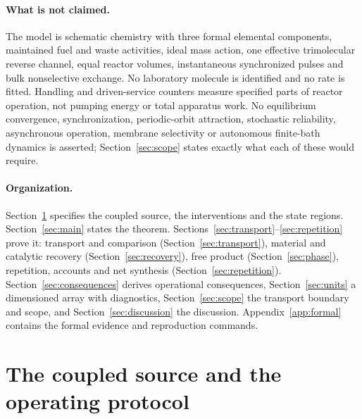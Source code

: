 \documentclass[11pt,a4paper]{article}
\theoremstyle{plain}
\theoremstyle{definition}
\theoremstyle{remark}
\begin{document}
\paragraph{What is not claimed.}
The model is schematic chemistry with three formal elemental components, maintained fuel and waste activities, ideal mass action, one effective trimolecular reverse channel, equal reactor volumes, instantaneous synchronized pulses and bulk nonselective exchange. No laboratory molecule is identified and no rate is fitted. Handling and driven-service counters measure specified parts of reactor operation, not pumping energy or total apparatus work. No equilibrium convergence, synchronization, periodic-orbit attraction, stochastic reliability, asynchronous operation, membrane selectivity or autonomous finite-bath dynamics is asserted; Section~\ref{sec:scope} states exactly what each of these would require.

\paragraph{Organization.}
Section~\ref{sec:model} specifies the coupled source, the interventions and the state regions. Section~\ref{sec:main} states the theorem. Sections~\ref{sec:transport}--\ref{sec:repetition} prove it: transport and comparison (Section~\ref{sec:transport}), material and catalytic recovery (Section~\ref{sec:recovery}), free product (Section~\ref{sec:phase}), repetition, accounts and net synthesis (Section~\ref{sec:repetition}). Section~\ref{sec:consequences} derives operational consequences, Section~\ref{sec:units} a dimensioned array with diagnostics, Section~\ref{sec:scope} the transport boundary and scope, and Section~\ref{sec:discussion} the discussion. Appendix~\ref{app:formal} contains the formal evidence and reproduction commands.

\section{The coupled source and the operating protocol}\label{sec:model}
\end{document}
